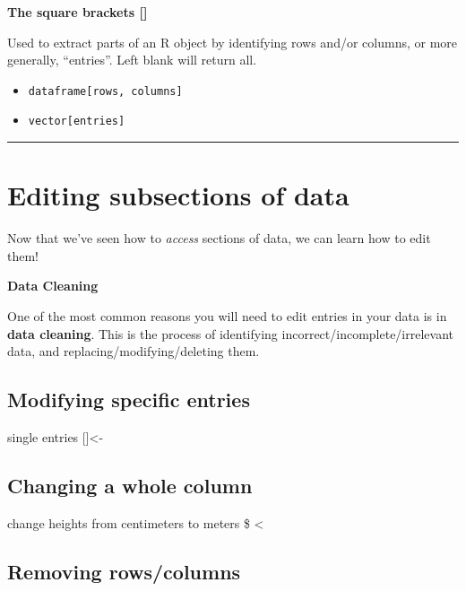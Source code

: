 \documentclass[]{book}
\providecommand{\tightlist}{%
  \setlength{\itemsep}{0pt}\setlength{\parskip}{0pt}}
\begin{document}
\textbf{The square brackets {[}{]}}

Used to extract parts of an R object by identifying rows and/or columns, or more generally, ``entries''. Left blank will return all.

\begin{itemize}
\tightlist
\item
  \texttt{dataframe{[}rows,\ columns{]}}~\\
\item
  \texttt{vector{[}entries{]}}
\end{itemize}

\begin{center}\rule{0.5\linewidth}{0.5pt}\end{center}

\hypertarget{editing-subsections-of-data}{%
\section{Editing subsections of data}\label{editing-subsections-of-data}}

Now that we've seen how to \emph{access} sections of data, we can learn how to edit them!

\textbf{Data Cleaning}

One of the most common reasons you will need to edit entries in your data is in \textbf{data cleaning}. This is the process of identifying incorrect/incomplete/irrelevant data, and replacing/modifying/deleting them.

\hypertarget{modifying-specific-entries}{%
\subsection*{Modifying specific entries}\label{modifying-specific-entries}}

single entries
{[}{]}\textless{}-

\hypertarget{changing-a-whole-column}{%
\subsection*{Changing a whole column}\label{changing-a-whole-column}}

change heights from centimeters to meters
\$ \textless{}

\hypertarget{removing-rowscolumns}{%
\subsection*{Removing rows/columns}\label{removing-rowscolumns}}
\end{document}
